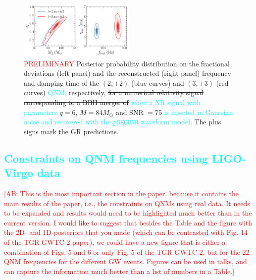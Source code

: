 \documentclass[twocolumn,prd,aps,superscriptaddress,preprintnumbers,tightenlines,showpacs,nofootinbib,eqsecnum,amsfonts,amsmath]{revtex4-1}
\newcommand{\ab}[1]{\textcolor{cyan}{#1}}
\newcommand{\comment}[1]{\textcolor{red}{[#1]}}
\newcommand{\Mo}{M_{\odot}}
\newcommand{\pSEOB}{\texttt{pSEOBNR}}
\begin{document}

\begin{figure}
	\includegraphics[width=0.5\textwidth]{figures/nohair_sxs_0166.png}	
	\caption{\textcolor{red}{PRELIMINARY} Posterior probability distribution on the fractional deviations (left panel) and the reconstructed (right panel) frequency and damping time of the $(2,\pm 2)$ (blue curves) and $(3,\pm 3)$ (red curves) \ab{QNM,} respectively, \sout{for a numerical relativity signal corresponding to a BBH merger of} \ab{when a NR signal with parameters} $q=6$,  $M=84 \Mo$ and SNR $=75$ \ab{is injected in Gaussian noise and recovered with the $\pSEOB$ waveform model}. The plus signs mark the GR predictions.}
	\label{fig:nohair_sxs}
\end{figure}

\ab{\section{Constraints on QNM frequencies using LIGO-Virgo data}}

\comment{AB: This is the most important section in the paper, because it contains the 
main results of the paper, i.e., the constraints on QNMs using real data. It needs to 
be expanded and results would need to be highlighted much better than in the current version. 
I would like to suggest that besides the Table and the figure with the 2D- and 1D-posteriors 
that you made (which can be contrasted with Fig. 14 of the TGR GWTC-2 paper), we could have 
a new figure that is either a combination of Figs. 5 and 6 or only Fig. 5 of the 
TGR GWTC-2, but for the 22 QNM frequencies for the different GW events. 
Figures can be used in talks, and can capture the information much better 
than a list of numbers in a Table.}
\end{document}
